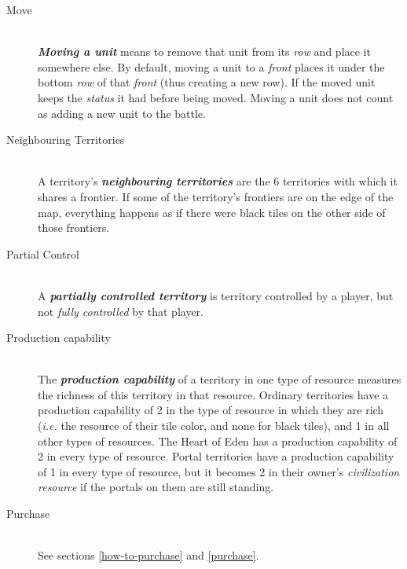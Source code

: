 \documentclass[a4paper]{article}
\begin{document}
\begin{description}
        \item[Move] \hfill \\
            \textbf{\textit{Moving a unit}} means to remove that unit from its
            \textit{row} and place it somewhere else.
            By default, moving a unit to a \textit{front} places it
            under the bottom \textit{row} of that \textit{front}
            (thus creating a new row).
            If the moved unit keeps the \textit{status} it had before being moved.
            Moving a unit does not count as adding a new unit to the battle.
            
        \item[Neighbouring Territories] \hfill \\
            A territory's \textbf{\textit{neighbouring territories}} are the 6 territories
            with which it shares a frontier.
            If some of the territory's frontiers are on the edge of the map,
            everything happens as if there were black tiles
            on the other side of those frontiers.
            
        \item[Partial Control] \hfill \\
            A \textbf{\textit{partially controlled territory}} is territory controlled
            by a player, but not \textit{fully controlled} by that player.
            
        \item[Production capability] \hfill \\
            The \textbf{\textit{production capability}} of a territory in one type
            of resource measures the richness of this territory in that resource.
            Ordinary territories have a production capability of 2 in the type of resource
            in which they are rich (\textit{i.e.} the resource of their tile color,
            and none for black tiles), and 1 in all other types of resources.
            The Heart of Eden has a production capability of 2 in every type
            of resource.
            Portal territories have a production capability of 1 in every type of resource,
            but it becomes 2 in their owner's \textit{civilization resource}
            if the portals on them are still standing.
            
        \item[Purchase] \hfill \\
            See sections \ref{how-to-purchase} and \ref{purchase}.
            

\end{description}
\end{document}
